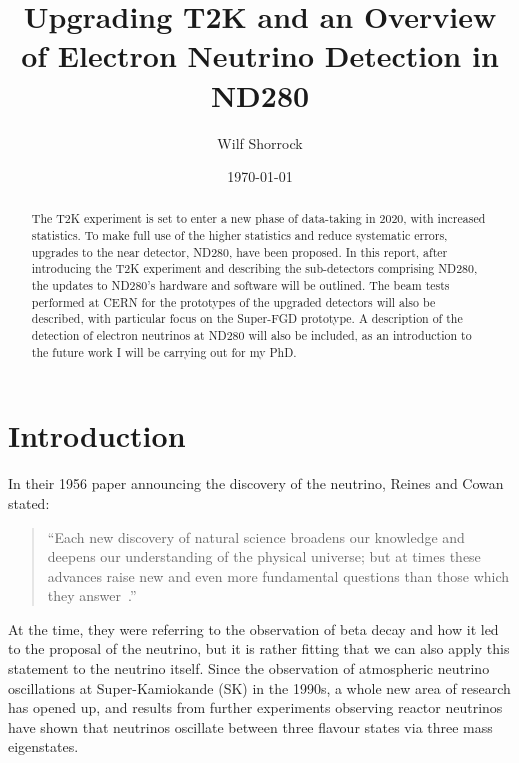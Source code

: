 \documentclass[aps,pra,12pt,notitlepage,tightenlines]{revtex4-1}
\begin{document}
\title{Upgrading T2K and an Overview of Electron Neutrino Detection in ND280\vspace{0mm}}
\author{Wilf Shorrock\vspace{1mm}}
\date{\today}
\begin{abstract}
\linespread{0.97}
\vspace{1mm}The T2K experiment is set to enter a new phase of data-taking in 2020, with increased statistics. To make full use of the higher statistics and reduce systematic errors, upgrades to the near detector, ND280, have been proposed. In this report, after introducing the T2K experiment and describing the sub-detectors comprising ND280, the updates to ND280's hardware and software will be outlined. The beam tests performed at CERN for the prototypes of the upgraded detectors will also be described, with particular focus on the Super-FGD prototype. A description of the detection of electron neutrinos at ND280 will also be included, as an introduction to the future work I will be carrying out for my PhD.
\end{abstract}

\maketitle

\newpage
\tableofcontents
\newpage

\vspace{-8mm}

\section{Introduction}
In their 1956 paper announcing the discovery of the neutrino, Reines and Cowan stated:
\begin{quotation}
 ``Each new discovery of natural science broadens our knowledge and deepens our understanding of the    physical universe; but at times these advances raise new and even more fundamental questions than those     which they answer~\cite{1956Natur.178..446R}.''
\end{quotation}
At the time, they were referring to the observation of beta decay and how it led to the proposal of the neutrino, but it is rather fitting that we can also apply this statement to the neutrino itself. Since the observation of atmospheric neutrino oscillations at Super-Kamiokande (SK) in the 1990s, a whole new area of research has opened up, and results from further experiments observing reactor neutrinos~\cite{PhysRevLett.108.171803, PhysRevLett.108.191802, PhysRevLett.108.131801} have shown that neutrinos oscillate between three flavour states via three mass eigenstates. 
\end{document}
